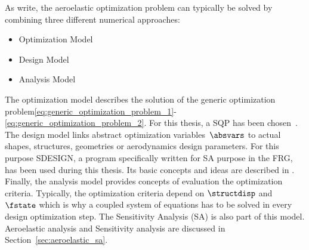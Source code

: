 \documentclass[../main.tex]{subfiles}
\begin{document}
As \cite{Maute2001} write, the aeroelastic optimization problem can typically be solved by combining three different numerical approaches:
\begin{itemize}
\item Optimization Model
\item Design Model
\item Analysis Model
\end{itemize}

The optimization model describes the solution of the generic optimization problem\eqref{eq:generic_optimization_problem_1}-\eqref{eq:generic_optimization_problem_2}. For this thesis, a \ac{SQP} has been chosen~\cite{Bonnans2006}.\\
The design model links abstract optimization variables~$\absvars$ to actual shapes, structures, geometries or aerodynamics design parameters. For this purpose SDESIGN, a program specifically written for \ac{SA} purpose in the \ac{FRG}, has been used during this thesis. Its basic concepts and ideas are described in \cite{Maute2003}.\\
Finally, the analysis model provides concepts of evaluation the optimization criteria. Typically, the optimization criteria depend on $\structdisp$ and $\fstate$ which is why a coupled system of equations has to be solved in every design optimization step. The Sensitivity Analysis (SA) is also part of this model. Aeroelastic analysis and Sensitivity analysis are discussed in Section~\ref{sec:aeroelastic_sa}.
\end{document}
